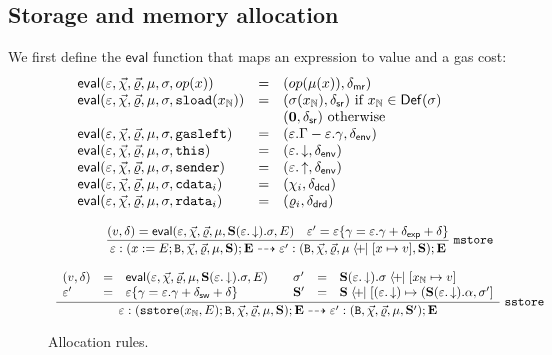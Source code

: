 \def\eval{\mathsf{eval}}
\subsection{Storage and memory allocation}
We first define the $\eval$ function that maps an expression to value and a gas cost:
$$
\begin{array}{lll}
    \eval(\env, \callData, \retData, \mu, \sigma, op(x)) &=& 
    (op(\mu(x)),\dmr) \\
    \eval(\env, \callData, \retData, \mu, \sigma, \sload{x_\Nat}) &=& (\sigma(x_\Nat),\dsr) \hbox{ if } x_\Nat\in\Def(\sigma)\\
    && (\z,\dsr) \hbox{ otherwise} \\
    \eval(\env, \callData, \retData, \mu, \sigma, \mathtt{gasleft}) &=& (\env.\gasmax -\env.\gasspent,\denv) \\
    \eval(\env, \callData, \retData, \mu, \sigma, \mathtt{this}) &=& (\env.\this,\denv) \\
    \eval(\env, \callData, \retData, \mu, \sigma, \mathtt{sender}) &=& (\env.\sender,\denv) \\
    \eval(\env, \callData, \retData, \mu, \sigma, \bcd_i) &=& (\cd_{i},\dcd) \\
    \eval(\env, \callData, \retData, \mu, \sigma, \brd_i) &=& (\rd_{i},\drd)
\end{array}
$$
\begin{figure}[ht]
$$
\begin{array}{c}
\dfrac{
(v,\delta)=\eval(\env, \callData, \retData, \mu, \Block(\env.\this).\sigma,E) \quad \env' = \env\set{\gasspent=\env.\gasspent + \dxp+\delta}
}
{
\env:(x:=E;\Byt, \callData,\retData,\mu, \Block);\Exec \rar \env':(\Byt, \callData,\retData,\mu\upd[x\mapsto v],\Block);\Exec
}\rlab{mstore}
\\\\
\dfrac{
\begin{array}{lll}
    (v,\delta)&=&\eval(\env,  \callData,\retData, \mu, \Block(\env.\this).\sigma,E) \\
    \env'&=&\env\set{\gasspent= \env.\gasspent + \dsw+\delta}
\end{array}
\quad 
\begin{array}{lll}
    \sigma' &=& \Block(\env.\this).\sigma \upd [x_\Nat\mapsto v] \\
    \Block' &=& \Block \upd [(\env.\this)\mapsto (\Block(\env.\this).\Abi, \sigma']
\end{array}
}
{
\env:(\sstore{x_\Nat,E};\Byt, \callData,\retData, \mu, \Block);\Exec \rar \env':(\Byt, \callData,\retData,\mu,\Block');\Exec
}\rlab{sstore}
\end{array}
$$
\caption{Allocation rules.}
\end{figure}
